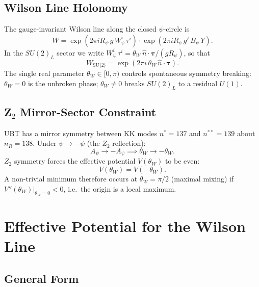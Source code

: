 \documentclass[12pt]{article}
\theoremstyle{definition}
\theoremstyle{remark}
\begin{document}
\subsection{Wilson Line Holonomy}

The gauge-invariant Wilson line along the closed $\psi$-circle is
\begin{equation}
  \label{eq:wilson_line}
  W = \exp\!\left(2\pi i R_\psi\,g\,W^i_\psi\,\tau^i\right)
      \cdot \exp\!\left(2\pi i R_\psi\,g'\,B_\psi\,Y\right).
\end{equation}
In the $SU(2)_L$ sector we write $W^i_\psi\,\tau^i = \theta_W\,\hat{n}\cdot\boldsymbol{\tau}/(gR_\psi)$,
so that
\begin{equation}
  W_{\text{SU(2)}} = \exp(2\pi i\,\theta_W\,\hat{n}\cdot\boldsymbol{\tau}).
\end{equation}
The single real parameter $\theta_W \in [0, \pi)$ controls spontaneous
symmetry breaking: $\theta_W = 0$ is the unbroken phase; $\theta_W \neq 0$
breaks $SU(2)_L$ to a residual $U(1)$.

\subsection{Z\texorpdfstring{$_2$}{2} Mirror-Sector Constraint}

UBT has a mirror symmetry between KK modes $n^* = 137$ and $n^{**} = 139$
about $n_R = 138$.  Under $\psi \to -\psi$ (the $Z_2$ reflection):
\begin{equation}
  A_\psi \to -A_\psi \implies \theta_W \to -\theta_W.
\end{equation}
$Z_2$ symmetry forces the effective potential $V(\theta_W)$ to be even:
\begin{equation}
  V(\theta_W) = V(-\theta_W).
\end{equation}
A non-trivial minimum therefore occurs at $\theta_W = \pi/2$ (maximal
mixing) if $V''(\theta_W)\big|_{\theta_W=0} < 0$, i.e.\ the origin is
a local maximum.

\section{Effective Potential for the Wilson Line}
\label{sec:veff}

\subsection{General Form}
\end{document}
